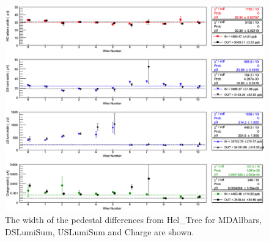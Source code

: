 
\begin{singlespace}
\begin{figure}[!h]
	\centering
	\includegraphics[width=15.0cm]{figures/differencesSumWidth}
	\caption
	{The width of the pedestal differences from Hel\_Tree for MDAllbars, DSLumiSum, USLumiSum and Charge are shown.}
	\label{fig:differencesSumWidth}
\end{figure}
\end{singlespace}

